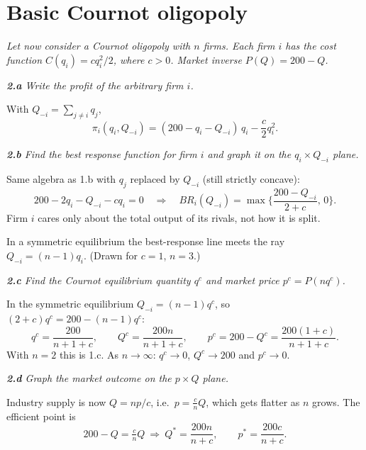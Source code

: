 \documentclass[11pt]{article}
\newcommand{\question}[1]{\par\smallskip\noindent\colorbox{black!6}{\parbox{\dimexpr\linewidth-2\fboxsep}{\itshape #1}}\par\smallskip}
\begin{document}
\section{Basic Cournot oligopoly}

\question{Let now consider a Cournot oligopoly with $n$ firms. Each firm $i$ has the cost function $C(q_i)=cq_i^2/2$, where $c>0$. Market inverse $P(Q)=200-Q$.}

\question{\textbf{2.a} Write the profit of the arbitrary firm $i$.}

With $Q_{-i}=\sum_{j\ne i}q_j$,
\[
\pi_i(q_i,Q_{-i})=(200-q_i-Q_{-i})\,q_i-\frac{c}{2}q_i^2 .
\]

\question{\textbf{2.b} Find the best response function for firm $i$ and graph it on the $q_i\times Q_{-i}$ plane.}

Same algebra as 1.b with $q_j$ replaced by $Q_{-i}$ (still strictly concave):
\[
200-2q_i-Q_{-i}-cq_i=0\quad\Longrightarrow\quad BR_i(Q_{-i})=\max\Big\{\frac{200-Q_{-i}}{2+c},\,0\Big\}.
\]
Firm $i$ cares only about the total output of its rivals, not how it is split.

\begin{center}
\end{center}
In a symmetric equilibrium the best-response line meets the ray $Q_{-i}=(n-1)q_i$. (Drawn for $c=1$, $n=3$.)

\question{\textbf{2.c} Find the Cournot equilibrium quantity $q^c$ and market price $p^c=P(nq^c)$.}

In the symmetric equilibrium $Q_{-i}=(n-1)q^c$, so $(2+c)q^c=200-(n-1)q^c$:
\[
q^c=\frac{200}{n+1+c},\qquad Q^c=\frac{200n}{n+1+c},\qquad p^c=200-Q^c=\frac{200(1+c)}{n+1+c}.
\]
With $n=2$ this is 1.c. As $n\to\infty$: $q^c\to0$, $Q^c\to200$ and $p^c\to0$.

\question{\textbf{2.d} Graph the market outcome on the $p\times Q$ plane.}

Industry supply is now $Q=np/c$, i.e.\ $p=\tfrac{c}{n}Q$, which gets flatter as $n$ grows. The efficient point is
\[
200-Q=\tfrac{c}{n}Q\ \Longrightarrow\ Q^*=\frac{200n}{n+c},\qquad p^*=\frac{200c}{n+c}.
\]
\end{document}
